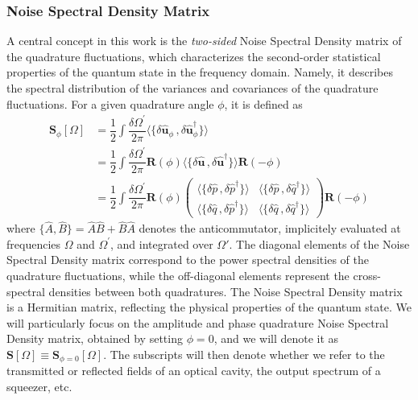 \subsubsection{Noise Spectral Density Matrix}
A central concept in this work is the \textit{two-sided} Noise Spectral Density matrix of the quadrature fluctuations, which characterizes the second-order statistical properties of the quantum state in the frequency domain. Namely, it describes the spectral distribution of the variances and covariances of the quadrature fluctuations. For a given quadrature angle \(\phi\), it is defined as
\begin{equation}
\begin{split}
  \mathbf{S}_{\phi} [\Omega]& =   \dfrac{1}{2} \int \dfrac{\delta \Omega^{'} }{2\pi} \langle \{\delta \mathbf{\hat{u}}_{\phi}\, , \delta \mathbf{\hat{u}}_{\phi}^{\dagger} \} \rangle \\
  & =  \dfrac{1}{2}    \int \dfrac{\delta \Omega^{'} }{2\pi} \mathbf{R}(\phi) \langle \{\delta \mathbf{\hat{u}}\, , \delta \mathbf{\hat{u}}^{\dagger} \} \rangle \mathbf{R}(-\phi)  \\
  & = \dfrac{1}{2}  \int \dfrac{\delta \Omega^{'} }{2\pi}  \mathbf{R}(\phi)  \begin{pmatrix}
  \langle \{\delta \hat{p}\, , \delta \hat{p}^\dagger \} \rangle & \langle \{ \delta \hat{p}\, , \delta \hat{q}^\dagger \}\rangle \\[4pt]
  \langle \{\delta \hat{q}\, , \delta \hat{p}^\dagger \}\rangle & \langle \{ \delta \hat{q}\, , \delta \hat{q}^\dagger \} \rangle 
  \end{pmatrix}  \mathbf{R}(-\phi)
\end{split}
\label{eq:Sa}
\end{equation}
where \(\{\hat{A},\hat{B}\} = \hat{A}\hat{B} + \hat{B}\hat{A}\) denotes the anticommutator, implicitely evaluated at frequencies \(\Omega\) and \(\Omega^{'}\), and integrated over \(\Omega'\). The diagonal elements of the Noise Spectral Density matrix correspond to the power spectral densities of the quadrature fluctuations, while the off-diagonal elements represent the cross-spectral densities between both quadratures. The Noise Spectral Density matrix is a Hermitian matrix, reflecting the physical properties of the quantum state. We will particularly focus on the amplitude and phase quadrature Noise Spectral Density matrix, obtained by setting \(\phi = 0\), and we will denote it as \(\mathbf{S}[\Omega]\equiv \mathbf{S}_{\phi=0}[\Omega]\). The subscripts will then denote whether we refer to the transmitted or reflected fields of an optical cavity, the output spectrum of a squeezer, etc. 
